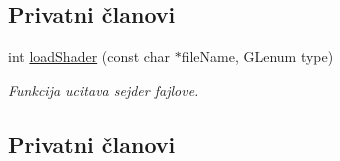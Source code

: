 \subsection*{Privatni članovi}
\begin{DoxyCompactItemize}
\item 
int \hyperlink{classshader_1_1TerrainShader_ada18e1df5cf7306eff49886a35298ef7}{load\+Shader} (const char $\ast$file\+Name, G\+Lenum type)
\begin{DoxyCompactList}\small\item\em Funkcija ucitava sejder fajlove. \end{DoxyCompactList}\end{DoxyCompactItemize}
\subsection*{Privatni članovi}
